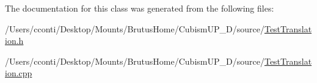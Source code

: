 The documentation for this class was generated from the following files\+:\begin{DoxyCompactItemize}
\item 
/\+Users/cconti/\+Desktop/\+Mounts/\+Brutus\+Home/\+Cubism\+U\+P\+\_\+D/source/\hyperlink{_test_translation_8h}{Test\+Translation.\+h}\item 
/\+Users/cconti/\+Desktop/\+Mounts/\+Brutus\+Home/\+Cubism\+U\+P\+\_\+D/source/\hyperlink{_test_translation_8cpp}{Test\+Translation.\+cpp}\end{DoxyCompactItemize}
